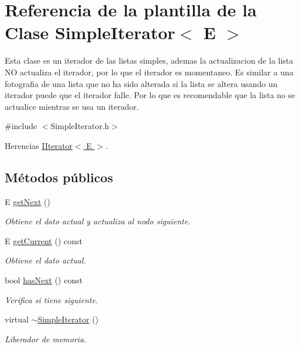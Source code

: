\hypertarget{classSimpleIterator}{\section{Referencia de la plantilla de la Clase Simple\-Iterator$<$ E $>$}
\label{classSimpleIterator}
}


Esta clase es un iterador de las listas simples, ademas la actualizacion de la lista N\-O actualiza el iterador, por lo que el iterador es momentaneo. Es similar a una fotografia de una lista que no ha sido alterada si la lista se altera usando un iterador puede que el iterador falle. Por lo que es recomendable que la lista no se actualice mientras se usa un iterador.  




{\ttfamily \#include $<$Simple\-Iterator.\-h$>$}



Herencias \hyperlink{classIIterator}{I\-Iterator$<$ E $>$}.

\subsection*{Métodos públicos}
\begin{DoxyCompactItemize}
\item 
E \hyperlink{classSimpleIterator_ab01032dba9ff4f1a1c47af3082b717d5}{get\-Next} ()
\begin{DoxyCompactList}\small\item\em Obtiene el dato actual y actualiza al nodo siguiente. \end{DoxyCompactList}\item 
E \hyperlink{classSimpleIterator_ac9460c98985a20f781f351c85b8a3ba2}{get\-Current} () const 
\begin{DoxyCompactList}\small\item\em Obtiene el dato actual. \end{DoxyCompactList}\item 
bool \hyperlink{classSimpleIterator_ab946b3d707e32d4d53f15af201ea2113}{has\-Next} () const 
\begin{DoxyCompactList}\small\item\em Verifica si tiene siguiente. \end{DoxyCompactList}\item 
\hypertarget{classSimpleIterator_a02203109d263581340152408ebb120a2}{virtual \hyperlink{classSimpleIterator_a02203109d263581340152408ebb120a2}{$\sim$\-Simple\-Iterator} ()}\label{classSimpleIterator_a02203109d263581340152408ebb120a2}

\begin{DoxyCompactList}\small\item\em Liberador de memoria. \end{DoxyCompactList}\end{DoxyCompactItemize}
